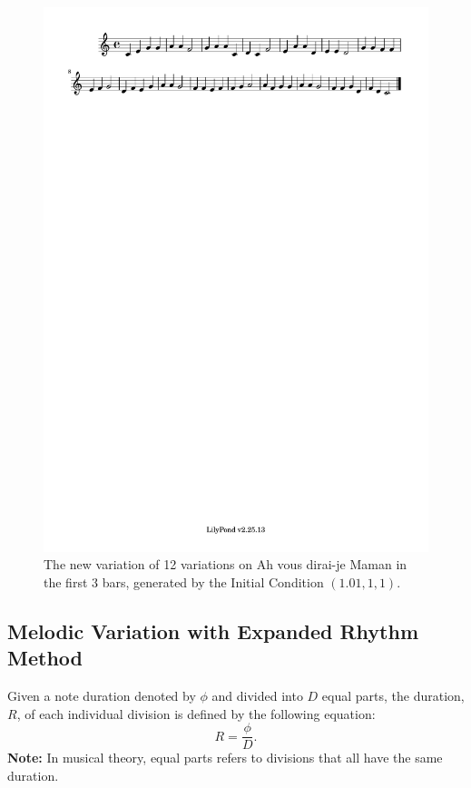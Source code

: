\documentclass[11pt]{article}
\begin{document}
\begin{figure}
\centering
\includegraphics[trim=1cm 26.5cm 10.1cm 0.02cm, clip, scale=1]{dabby_2.pdf}
\caption{The new variation of 12 variations on Ah vous dirai-je Maman in the first 3 bars, generated by the Initial Condition $(1.01, 1, 1)$.}
\label{fig:Dabby2}
\end{figure}

\subsection{Melodic Variation with Expanded Rhythm Method} 
Given a note duration denoted by $\phi$ and divided into $D$ equal parts, the duration, $R$, of each individual division is defined by the following equation:
$$ R = \frac{\phi}{D}.  $$
\textbf{Note:} In musical theory, equal parts refers to divisions that all have the same duration.
\end{document}
